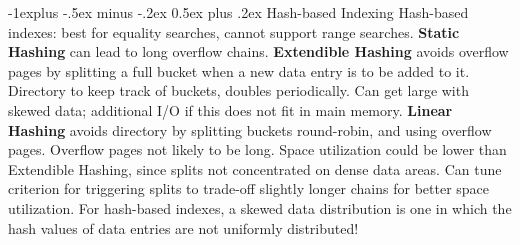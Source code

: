 \documentclass[12pt,landscape]{article}
\makeatletter
\renewcommand{\subsection}{\@startsection{subsection}{2}{0mm}%
                                {-1explus -.5ex minus -.2ex}%
                                {0.5ex plus .2ex}%
                                {\normalfont\normalsize\bfseries}}
\makeatother
\begin{document}
\begin{multicols}{3}
\subsection{Hash-based Indexing}
Hash-based indexes: best for equality searches, cannot support range searches. {\bf Static Hashing} can lead to long overflow chains. {\bf Extendible Hashing} avoids overflow pages by splitting a full bucket when a new data entry is to be added to it. Directory to keep track of buckets, doubles periodically. Can get large with skewed data; additional I/O if this does not fit in main memory. {\bf Linear Hashing} avoids directory by splitting buckets round-robin, and using overflow pages. Overflow pages not likely to be long. Space utilization could be lower than Extendible Hashing, since splits not concentrated on dense data areas. Can tune criterion for triggering splits to trade-off slightly longer chains for better space utilization. For hash-based indexes, a skewed data distribution is one in which the hash values of data entries are not uniformly distributed!


\end{multicols}
\end{document}
